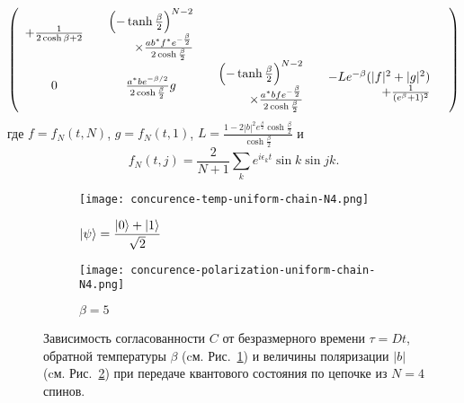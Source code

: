\begin{equation}
\begin{pmatrix}
\begin{array}{r}
    +\frac{1}{2\cosh{\beta}+2}
  \end{array}
  &
  \begin{array}{r}
    \left( -\tanh\frac{\beta}{2} \right)^{N-2} \\
    \times \frac{ab^*f^* e^{-\frac{\beta}{2}}}{2\cosh\frac{\beta}{2}}
  \end{array}
  &
  &
  &\\
  0
  &
  \frac{a^*b e^{-\beta /2}}{2\cosh\frac{\beta}{2}}g
  &
  \begin{array}{r}
    \left( -\tanh\frac{\beta}{2} \right) ^{N-2} \\
    \times \frac{a^*bf e^{-\frac{\beta}{2}}}{2\cosh\frac{\beta}{2}}
  \end{array}
  &
  \begin{array}{r}
    -L e^{-\beta}(|f|^2 +|g|^2)\\
    + \frac{1}{(e^{\beta}+1)^2}
  \end{array}
\end{pmatrix}
\end{equation}
\normalsize
где $f={f_N(t, N)}$, $g={f_N(t, 1)}$, $L=\frac{1-2|b|^2 e^{\frac{\beta}{2}}\cosh\frac{\beta}{2}}{\cosh\frac{\beta}{2}}$
и
%
\begin{equation}
  f_N(t, j) = \frac{2}{N+1}\sum_k e^{i\epsilon_k t}\sin k \sin jk.
\end{equation}

\begin{figure}[H]
  \begin{subfigure}{0.45\textwidth}
    \texttt{[image: concurence-temp-uniform-chain-N4.png]}
    \caption{
      $\left| \psi \right\rangle = \dfrac{\left| 0 \right\rangle + \left| 1 \right\rangle}{\sqrt{2}}$
    }
    \label{fig:concurence-temp-uniform-chain-N4}
  \end{subfigure}
  \hfill
  \begin{subfigure}{0.45\textwidth}
    \texttt{[image: concurence-polarization-uniform-chain-N4.png]}
    \caption{
      $\beta = 5$
    }
    \label{fig:concurence-polarization-uniform-chain-N4}
  \end{subfigure}
  \caption{
    Зависимость согласованности $C$ от безразмерного времени $\tau = Dt$,
    обратной температуры $\beta$
    (cм. Рис.~\ref{fig:concurence-temp-uniform-chain-N4})
    и величины поляризации $|b|$
    (cм. Рис.~\ref{fig:concurence-polarization-uniform-chain-N4})
    при передаче квантового состояния по цепочке из $N=4$ спинов.
  }
  \label{fig:councurence-uniform-chain-N4}
\end{figure}

